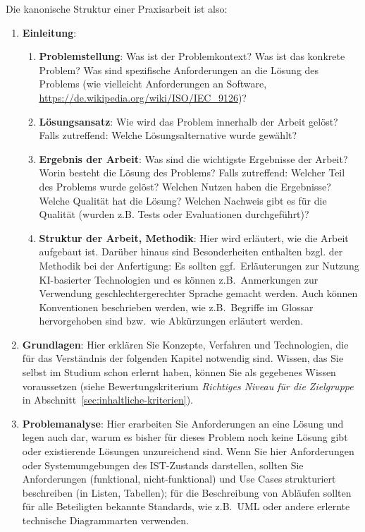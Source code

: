 Die kanonische Struktur einer Praxisarbeit ist also:

\begin{enumerate}
    \item \textbf{Einleitung}: 
    
    \begin{enumerate}
        \item \textbf{Problemstellung}:  Was ist der Problemkontext? Was ist das konkrete Problem? Was sind spezifische Anforderungen an die Lösung des Problems (wie vielleicht Anforderungen an Software, \url{https://de.wikipedia.org/wiki/ISO/IEC_9126})?
        \item \textbf{Lösungsansatz}: Wie wird das Problem innerhalb der Arbeit gelöst? Falls zutreffend: Welche Lösungsalternative wurde gewählt?
        \item \textbf{Ergebnis der Arbeit}: Was sind die wichtigste Ergebnisse der Arbeit? Worin besteht die Lösung des Problems? Falls zutreffend: Welcher Teil des Problems wurde gelöst? Welchen Nutzen haben die Ergebnisse? Welche Qualität hat die Lösung? Welchen Nachweis gibt es für die Qualität (wurden z.B. Tests oder Evaluationen durchgeführt)?
        \item \textbf{Struktur der Arbeit, Methodik}: Hier wird erläutert, wie die Arbeit aufgebaut ist. Darüber hinaus sind Besonderheiten enthalten bzgl. der Methodik bei der Anfertigung: Es sollten ggf.\ Erläuterungen zur Nutzung KI-basierter Technologien und es können z.B.\ Anmerkungen zur Verwendung geschlechtergerechter Sprache gemacht werden. Auch können Konventionen beschrieben werden, wie z.B.\ Begriffe im Glossar hervorgehoben sind bzw.\ wie Abkürzungen erläutert werden.
    \end{enumerate}
    \item \label{struktur:grundlagen} \textbf{Grundlagen}: Hier erklären Sie Konzepte, Verfahren und Technologien, die für das Verständnis der folgenden Kapitel notwendig sind. Wissen, das Sie selbst im Studium schon erlernt haben, können Sie als gegebenes Wissen voraussetzen (siehe Bewertungskriterium \textit{Richtiges Niveau für die Zielgruppe} in Abschnitt~\ref{sec:inhaltliche-kriterien}).
    \item \label{struktur:problemanalyse} \textbf{Problemanalyse}: Hier erarbeiten Sie Anforderungen an eine Lösung und legen auch dar, warum es bisher für dieses Problem noch keine Lösung gibt oder existierende Lösungen unzureichend sind. Wenn Sie hier Anforderungen oder Systemumgebungen des IST-Zustands darstellen, sollten Sie Anforderungen (funktional, nicht-funktional) und Use Cases strukturiert beschreiben (in Listen, Tabellen); für die Beschreibung von Abläufen sollten für alle Beteiligten bekannte Standards, wie z.B.\ UML oder andere erlernte technische Diagrammarten verwenden.

\end{enumerate}
